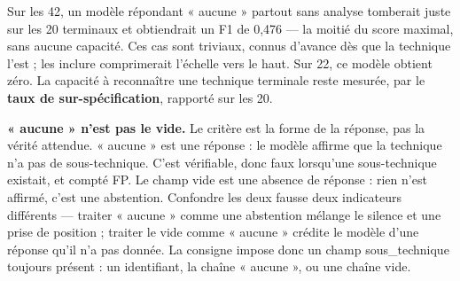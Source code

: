 Sur les 42, un modèle répondant « aucune » partout sans analyse tomberait juste sur les 20 terminaux et obtiendrait un F1 de 0,476 --- la moitié du score maximal, sans aucune capacité. Ces cas sont triviaux, connus d'avance dès que la technique l'est ; les inclure comprimerait l'échelle vers le haut. Sur 22, ce modèle obtient zéro. La capacité à reconnaître une technique terminale reste mesurée, par le \textbf{taux de sur-spécification}, rapporté sur les 20.

\textbf{« aucune » n'est pas le vide.} Le critère est la forme de la réponse, pas la vérité attendue. « aucune » est une réponse : le modèle affirme que la technique n'a pas de sous-technique. C'est vérifiable, donc faux lorsqu'une sous-technique existait, et compté FP. Le champ vide est une absence de réponse : rien n'est affirmé, c'est une abstention. Confondre les deux fausse deux indicateurs différents --- traiter « aucune » comme une abstention mélange le silence et une prise de position ; traiter le vide comme « aucune » crédite le modèle d'une réponse qu'il n'a pas donnée. La consigne impose donc un champ sous\_technique toujours présent : un identifiant, la chaîne « aucune », ou une chaîne vide.

